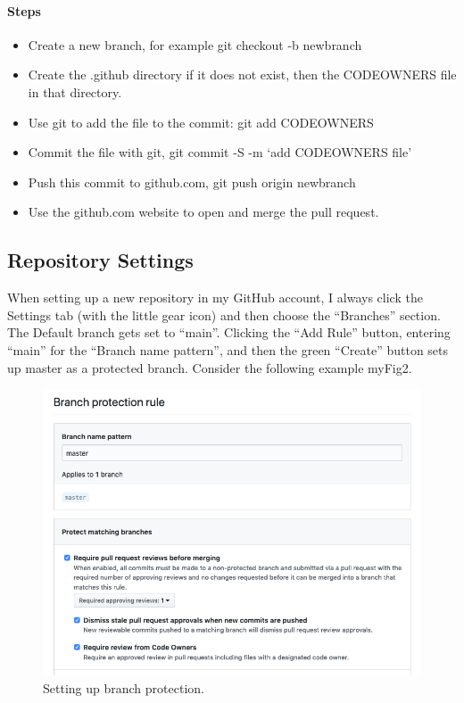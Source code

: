 \hypertarget{steps-4}{%
      \paragraph{Steps}\label{steps-4}}

\begin{itemize}
      \item
            Create a new branch, for example git checkout -b newbranch
      \item
            Create the .github directory if it does not exist, then the CODEOWNERS
            file in that directory.
      \item
            Use git to add the file to the commit: git add CODEOWNERS
      \item
            Commit the file with git, git commit -S -m `add CODEOWNERS file'
      \item
            Push this commit to github.com, git push origin newbranch
      \item
            Use the github.com website to open and merge the pull request.
\end{itemize}
\subsection{Repository Settings}
\justify{}
When setting up a new repository in my GitHub account, I always click
the Settings tab (with the little gear icon) and then choose the
``Branches'' section. The Default branch gets set to ``main''. Clicking
the ``Add Rule'' button, entering ``main'' for the ``Branch name pattern'',
and then the green ``Create'' button sets up master as a protected branch.
Consider the following example {myFig2}.
\begin{figure}
      \includegraphics[scale=0.50]{../images/github-branch-protection.png}
      \caption{Setting up branch protection.}
      \label{branchprotect}
\end{figure}

